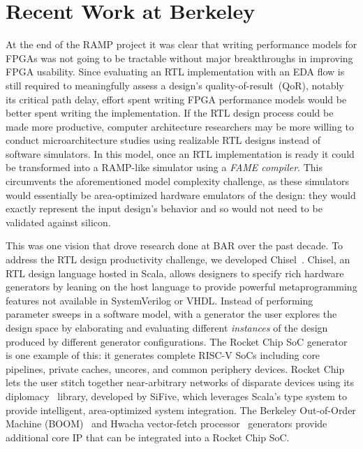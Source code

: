 \section{Recent Work at Berkeley}\label{sec:ucb-bar-recent-work}

At the end of the RAMP project it was clear that writing performance models for
FPGAs was not going to be tractable without major breakthroughs in improving
FPGA usability. Since evaluating an RTL implementation with an EDA flow is still
required to meaningfully assess a design's quality-of-result~(QoR), notably its critical path
delay, effort spent writing FPGA performance models would be better spent
writing the implementation. If the RTL design process could be made more productive,
computer architecture researchers may be more willing to conduct
microarchitecture studies using realizable RTL designs instead of software
simulators. In this model, once an RTL implementation is ready it could be
transformed into a RAMP-like simulator using a \emph{FAME compiler}. This circumvents the aforementioned model complexity challenge,
as these simulators would essentially be area-optimized hardware emulators of the design:
they would exactly represent the input design's behavior and so would not need
to be validated against silicon.

This was one vision that drove research done at BAR over the past decade.
To address the RTL design productivity challenge, we developed
Chisel~\cite{Chisel}. Chisel, an RTL design language hosted in Scala, allows
designers to specify rich hardware generators by leaning on the host language to provide
powerful metaprogramming features not available in SystemVerilog or VHDL.
Instead of performing parameter sweeps in a software model, with a generator
the user explores the design space by elaborating and evaluating different
\emph{instances} of the design produced by different generator configurations.
The Rocket Chip SoC generator~\cite{RocketChip} is one example of this: it
generates complete RISC-V SoCs including
core pipelines, private caches, uncores, and common periphery devices. Rocket
Chip lets the user stitch together near-arbitrary networks of disparate devices
using its diplomacy~\cite{Diplomacy} library, developed by SiFive, which leverages Scala's type
system to provide intelligent, area-optimized system integration. The
Berkeley Out-of-Order Machine (BOOM)~\cite{BOOM} and Hwacha vector-fetch
processor~\cite{Hwacha} generators provide additional core IP that can be
integrated into a Rocket Chip SoC.


